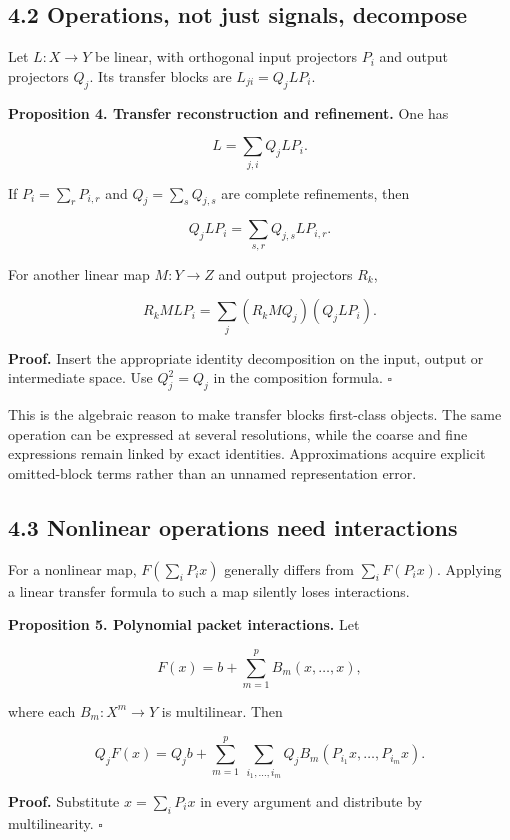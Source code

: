 \documentclass[11pt,letterpaper]{article}
\begin{document}
\subsection{4.2 Operations, not just signals,
decompose}\label{operations-not-just-signals-decompose}

Let \(L:X\to Y\) be linear, with orthogonal input projectors \(P_i\) and
output projectors \(Q_j\). Its transfer blocks are \(L_{ji}=Q_jLP_i\).

\textbf{Proposition 4. Transfer reconstruction and refinement.} One has

\[
L=\sum_{j,i}Q_jLP_i.
\]

If \(P_i=\sum_rP_{i,r}\) and \(Q_j=\sum_sQ_{j,s}\) are complete
refinements, then

\[
Q_jLP_i=\sum_{s,r}Q_{j,s}LP_{i,r}.
\]

For another linear map \(M:Y\to Z\) and output projectors \(R_k\),

\[
R_kMLP_i=\sum_j(R_kMQ_j)(Q_jLP_i).
\]

\textbf{Proof.} Insert the appropriate identity decomposition on the
input, output or intermediate space. Use \(Q_j^2=Q_j\) in the
composition formula. \(\square\)

This is the algebraic reason to make transfer blocks first-class
objects. The same operation can be expressed at several resolutions,
while the coarse and fine expressions remain linked by exact identities.
Approximations acquire explicit omitted-block terms rather than an
unnamed representation error.

\subsection{4.3 Nonlinear operations need
interactions}\label{nonlinear-operations-need-interactions}

For a nonlinear map, \(F(\sum_iP_ix)\) generally differs from
\(\sum_iF(P_ix)\). Applying a linear transfer formula to such a map
silently loses interactions.

\textbf{Proposition 5. Polynomial packet interactions.} Let

\[
F(x)=b+\sum_{m=1}^{p}B_m(x,\ldots,x),
\]

where each \(B_m:X^m\to Y\) is multilinear. Then

\[
Q_jF(x)=Q_jb+
\sum_{m=1}^{p}\ \sum_{i_1,\ldots,i_m}
Q_jB_m(P_{i_1}x,\ldots,P_{i_m}x).
\]

\textbf{Proof.} Substitute \(x=\sum_iP_ix\) in every argument and
distribute by multilinearity. \(\square\)
\end{document}
